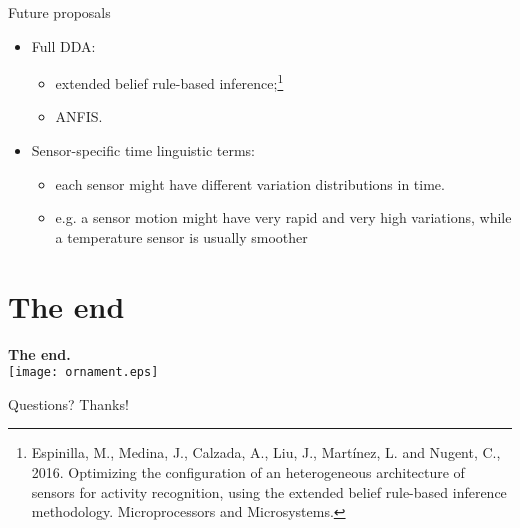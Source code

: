 \documentclass[9pt, handout]{beamer}
\begin{document}
      \begin{frame}{Future proposals}
        \pause
        \begin{itemize}
          \item Full DDA:
          \begin{itemize}
            \item extended belief rule-based inference;\footnote{Espinilla, M., Medina, J., Calzada, A., Liu, J., Martínez, L. and Nugent, C., 2016. Optimizing the configuration of an heterogeneous architecture of sensors for activity recognition, using the extended belief rule-based inference methodology. Microprocessors and Microsystems.}
            \item ANFIS.
          \end{itemize}
          \pause
          \item Sensor-specific time linguistic terms:
          \begin{itemize}
            \item each sensor might have different variation distributions in time.
            \item e.g. a sensor motion might have very rapid and very high variations, while a temperature sensor is usually smoother
          \end{itemize}
        \end{itemize}
      \end{frame}
      
  \section*{The end}
    \begin{frame}
      \begin{center}
      	\textbf{\calligra\Huge The end.}\\
        \texttt{[image: ornament.eps]}
        
      	\pause
      	\vspace{1cm}
      	{\huge\calligra Questions?\pause{} Thanks!}
      \end{center}
    \end{frame}
      
\end{document}
